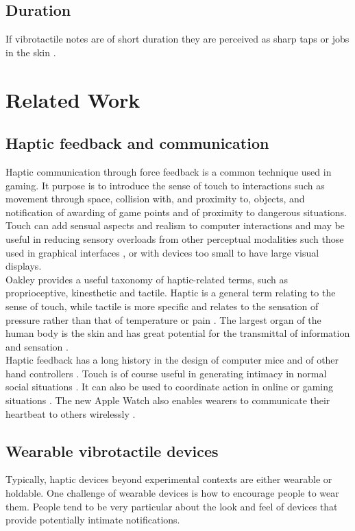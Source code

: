 \documentclass[a4paper, twocolumn]{article}
\begin{document}
\subsection{Duration}
If vibrotactile notes are of short duration they are perceived as sharp taps or jobs in the skin \cite{gunther2003cutaneous}. 


\section{Related Work}

\subsection{Haptic feedback and communication}
Haptic communication through force feedback is a common technique used in gaming. It purpose is to introduce the sense of touch to interactions such as movement through space, collision with, and proximity to, objects, and notification of awarding of game points and of proximity to dangerous situations. Touch can add sensual aspects and realism to computer interactions and may be useful in reducing sensory overloads from other perceptual modalities such those used in graphical interfaces \cite{oakley2000putting}, or with devices too small to have large visual displays.\\

Oakley provides a useful taxonomy of haptic-related terms, such as proprioceptive, kinesthetic and tactile. Haptic is a general term relating to the sense of touch, while tactile is more specific and relates to the sensation of pressure rather than that of temperature or pain \cite{oakley2000putting}. The largest organ of the human body is the skin and has great potential for the transmittal of information and sensation \cite{lindeman2006wearable} \cite{brewster2004tactons}.\\

Haptic feedback has a long history in the design of computer mice and of other hand controllers \cite{yang2005novel}. Touch is of course useful in generating intimacy in normal social situations \cite{bronner1982haptic}. It can also be used to coordinate action in online or gaming situations \cite{ho1998experiment}. The new Apple Watch also enables wearers to communicate their heartbeat to others wirelessly \cite{johnson2014literature}.\\

\subsection{Wearable vibrotactile devices}
Typically, haptic devices beyond experimental contexts are either wearable or holdable. One challenge of wearable devices is how to encourage people to wear them. People tend to be very particular about the look and feel of devices that provide potentially intimate notifications.\\ 
\end{document}
